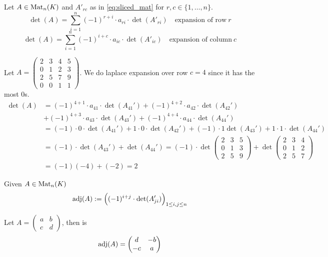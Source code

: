 \begin{proposition}\label{pro:laplace}
   Let \(A \in \operatorname{Mat}_n(K)\) and \(A'_{rc}\) as in \cref{eq:sliced_mat} for \(r, c \in \{1, \ldots, n\}\).
   \[\det(A) = \sum_{i=1}^n (-1)^{r+i} \cdot a_{ri} \cdot \det(A'_{ri}) \quad\text{expansion of row}~r\]
   \[\det(A) = \sum_{i=1}^n (-1)^{i+c} \cdot a_{ic} \cdot \det(A'_{ic}) \quad\text{expansion of column}~c\]
\end{proposition}
\begin{example}
   Let \(A = \begin{pmatrix}2&3&4&5\\0&1&2&3\\2&5&7&9\\0&0&1&1\end{pmatrix}\).
   We do laplace expansion over row \(c = 4\) since it has the most 0s.
   \begin{equation*}
      \begin{split}
         \det(A) & = (-1)^{4+1} \cdot a_{41} \cdot \det(A_{41}') + (-1)^{4+2} \cdot a_{42} \cdot \det(A_{42}')\\
                 & + (-1)^{4+3} \cdot a_{43} \cdot \det(A_{43}') + (-1)^{4+4} \cdot a_{44} \cdot \det(A_{44}')\\
                 & = (-1) \cdot 0 \cdot \det(A_{41}') + 1 \cdot 0 \cdot \det(A_{42}') + (-1) \cdot 1 \det(A_{43}') + 1 \cdot 1 \cdot \det(A_{44}')\\
                 & = (-1) \cdot \det(A_{43}') + \det(A_{44}') = (-1) \cdot \det\begin{pmatrix}2&3&5\\0&1&3\\2&5&9\end{pmatrix} + \det\begin{pmatrix}2&3&4\\0&1&2\\2&5&7\end{pmatrix}\\
                 & = (-1)(-4) + (-2) = 2
      \end{split}
   \end{equation*}
\end{example}

\begin{definition}
   Given \(A \in \operatorname{Mat}_n(K)\)
   \[\operatorname{adj}(A) := \Big((-1)^{i+j} \cdot \det(A_{ji}')\Big)_{1 \leq i, j \leq n}\]
\end{definition}
\begin{example}
   Let \(A = \begin{pmatrix}a&b\\c&d\end{pmatrix}\), then is
   \[\operatorname{adj}(A) = \begin{pmatrix}d&-b\\-c&a\end{pmatrix}\]
\end{example}

